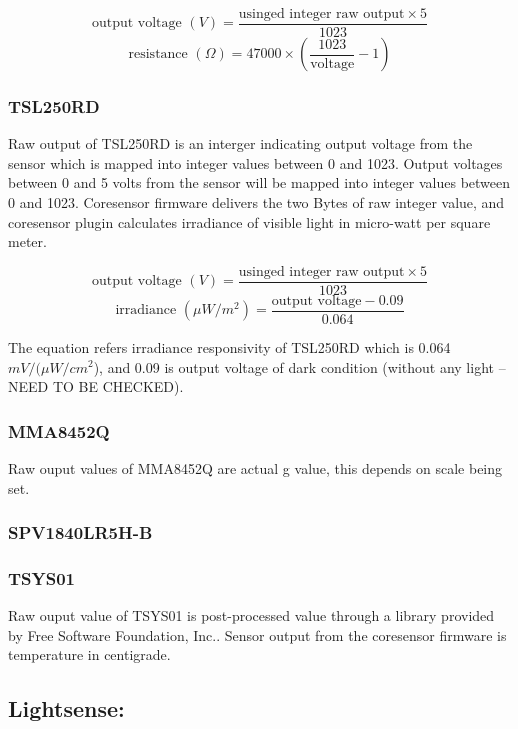 {\centering
 \[ \text{output voltage } (V) = \frac{\text{usinged integer raw output} \times 5}{1023} \] 
 \[ \text{resistance } (\Omega) = 47000 \times \left(\frac{1023}{\text{voltage}} - 1\right) \]
 \par
 }


\subsubsection{ TSL250RD}

Raw output of TSL250RD is an interger indicating output voltage from the sensor which is mapped into integer values between 0 and 1023. Output voltages between 0 and 5 volts from the sensor will be mapped into integer values between 0 and 1023. Coresensor firmware delivers the two Bytes of raw integer value, and coresensor plugin calculates irradiance of visible light in micro-watt per square meter.

{\centering
 \[ \text{output voltage }(V) = \frac{\text{usinged integer raw output} \times 5}{1023} \] 
 \[ \text{irradiance } (\mu W/m^2) = \frac{\text{output voltage} - 0.09}{0.064} \]
 \par
 }
 
\bigbreak
The equation refers irradiance responsivity of TSL250RD which is 0.064 \(mV/(\mu W/cm^2\)), and 0.09 is output voltage of dark condition (without any light -- NEED TO BE CHECKED).

\subsubsection{ MMA8452Q}

Raw ouput values of MMA8452Q are actual g value, this depends on scale being set.

\subsubsection{ SPV1840LR5H-B}

\subsubsection{ TSYS01}

Raw ouput value of TSYS01 is post-processed value through a library provided by  Free Software Foundation, Inc.. Sensor output from the coresensor firmware is temperature in centigrade.


\subsection{Lightsense:}
